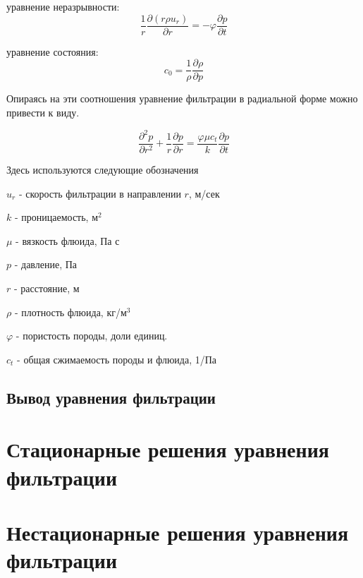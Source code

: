 уравнение неразрывности: 
\begin{equation} \label{eq:mass_balance_1} 
\frac{1}{r}\frac{\partial\left(r\rho u_r\right)}{\partial r}=-\varphi\frac{\partial p}{\partial t} 
\end{equation}

уравнение состояния: 
\begin{equation} \label{eq:eos_1} 
c_0=\frac{1}{\rho}\frac{\partial\rho}{\partial p} 
\end{equation}

Опираясь на эти соотношения уравнение фильтрации в радиальной форме можно привести к виду.

\begin{equation} \label{eq:diff_eq_1} 
\frac{\partial ^2 p }{\partial r^2} + \frac{1}{r} \frac{\partial p}{\partial r} = \frac{\varphi \mu c_t}{k} \frac{\partial p}{\partial t} 
\end{equation}

Здесь используются следующие обозначения

$u_r$ - скорость фильтрации в направлении $r$, м/сек

$k$ - проницаемость, м$^2$

$\mu$ - вязкость флюида, Па с

$p$ - давление, Па 

$r$ - расстояние, м 

$\rho$ - плотность флюида, кг/м$^3$

$\varphi$ - пористость породы, доли единиц.

$c_t$ - общая сжимаемость породы и флюида, 1/Па

\subsection{Вывод уравнения фильтрации}



\section{Стационарные решения уравнения фильтрации}



\section{Нестационарные решения уравнения фильтрации}

